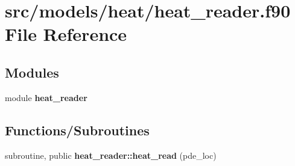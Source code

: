 \section{src/models/heat/heat\+\_\+reader.f90 File Reference}
\label{heat__reader_8f90}
\subsection*{Modules}
\begin{DoxyCompactItemize}
\item 
module {\bf heat\+\_\+reader}
\end{DoxyCompactItemize}
\subsection*{Functions/\+Subroutines}
\begin{DoxyCompactItemize}
\item 
subroutine, public {\bf heat\+\_\+reader\+::heat\+\_\+read} (pde\+\_\+loc)
\end{DoxyCompactItemize}
